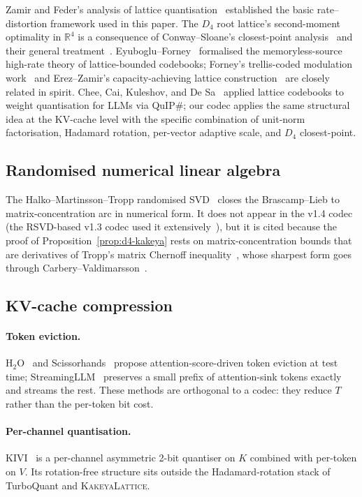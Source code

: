 \documentclass[11pt,a4paper]{article}
\theoremstyle{definition}
\theoremstyle{plain}
\newcommand{\R}{\mathbb{R}}
\begin{document}
Zamir and Feder's analysis of lattice
quantisation~\cite{zamir-feder} established the basic
rate--distortion framework used in this paper. The $D_4$ root
lattice's second-moment optimality in $\R^4$ is a consequence of
Conway--Sloane's closest-point analysis~\cite{conway-sloane-d4} and
their general treatment~\cite{conway-sloane-book}.
Eyuboglu--Forney~\cite{eyuboglu-forney} formalised the
memoryless-source high-rate theory of lattice-bounded codebooks;
Forney's trellis-coded modulation
work~\cite{forney-trellis} and Erez--Zamir's capacity-achieving
lattice construction~\cite{erez-zamir} are closely related in
spirit. Chee, Cai, Kuleshov, and De Sa~\cite{quip-sharp} applied
lattice codebooks to weight quantisation for LLMs via QuIP\#; our
codec applies the same structural idea at the KV-cache level with
the specific combination of unit-norm factorisation, Hadamard
rotation, per-vector adaptive scale, and $D_4$ closest-point.

\subsection{Randomised numerical linear algebra}

The Halko--Martinsson--Tropp randomised
SVD~\cite{halko-martinsson-tropp} closes the Brascamp--Lieb to
matrix-concentration arc in numerical form. It does not appear in
the v1.4 codec (the RSVD-based v1.3 codec used it
extensively~\cite{kakeya-v13-paper}), but it is cited because the
proof of
Proposition~\ref{prop:d4-kakeya} rests on matrix-concentration
bounds that are derivatives of Tropp's matrix Chernoff
inequality~\cite{tropp-matrix-chernoff}, whose sharpest form goes
through Carbery--Valdimarsson~\cite{carbery-valdimarsson}.

\subsection{KV-cache compression}

\paragraph{Token eviction.}
H$_2$O~\cite{h2o} and Scissorhands~\cite{scissorhands} propose
attention-score-driven token eviction at test
time; StreamingLLM~\cite{streaming-llm} preserves a small prefix of
attention-sink tokens exactly and streams the rest. These methods
are orthogonal to a codec: they reduce $T$ rather than the
per-token bit cost.

\paragraph{Per-channel quantisation.}
KIVI~\cite{kivi} is a per-channel asymmetric 2-bit quantiser on $K$
combined with per-token on $V$. Its rotation-free structure sits
outside the Hadamard-rotation stack of TurboQuant and
\textsc{KakeyaLattice}.
\end{document}
